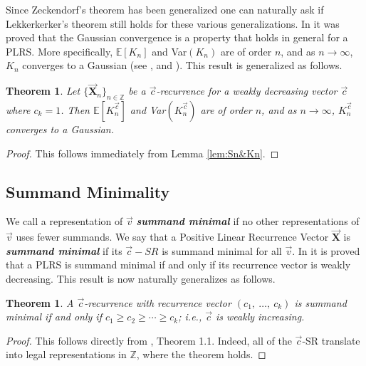 \documentclass[]{interact}
\newcommand{\Z}{{\mathbb Z}}  %
\newcommand{\vtr}[1]{\vec{\mathbf{#1}}}
\theoremstyle{plain}
\numberwithin{equation}{section} %
\newtheorem{theorem}[thm]{Theorem}
\numberwithin{table}{section} %
\numberwithin{figure}{section}
\newcommand{\X}{\vtr{X}}
\begin{document}
Since Zeckendorf's theorem has been generalized one can naturally ask if Lekkerkerker's theorem still holds for these various generalizations. In \textcolor{blue}{\cite{MW12}} it was proved that the Gaussian convergence is a property that holds in general for a PLRS. More specifically, $\mathbb{E}[K_n]$ and Var$(K_n)$ are of order $n$, and as $n \rightarrow \infty$, $K_n$ converges to a Gaussian (see \textcolor{blue}{\cite{KKMW11}}, \textcolor{blue}{\cite{BILMT13}} and \textcolor{blue}{\cite{Lekkerkerker51}}). This result is generalized as follows.

\begin{theorem}
    Let $\{\X_n\}_{n \in \Z}$ be a %
    $\vec{c}$-recurrence for a weakly decreasing vector $\vec{c}$ where $c_k = 1$. Then $\mathbb{E}[K_n^{\vec{c}}]$ and {\rm Var}$(K_n^{\vec{c}})$ are of order $n$, and as $n \rightarrow \infty$, $K_n^{\vec{c}}$ converges to a Gaussian.
\end{theorem}
\begin{proof}
    This follows immediately from Lemma \textcolor{blue}{\ref{lem:Sn&Kn}}.
\end{proof}

\subsection{Summand Minimality}\label{sec: SM}
We call a representation of $\vec{v}$ \textbf{\textit{summand minimal}} if no other representations of $\vec{v}$ uses fewer summands. We say that a Positive Linear Recurrence Vector $\X$ is \textbf{\textit{summand minimal} }if its $\vec{c}-SR$ is summand minimal for all $\vec{v}$. In \textcolor{blue}{\cite{CHHMPV18b}} it is proved that a PLRS is summand minimal if and only if its recurrence vector is weakly decreasing. This result is now naturally generalizes as follows.

\begin{theorem}\label{thm: c minimal}
    A %
    $\vec{c}$-recurrence with recurrence vector $(c_1, \ \ldots, \ c_k)$ is summand minimal if and only if $c_1\geq c_2\geq \cdots \geq c_k$; i.e., $\vec{c}$ is weakly increasing. 
\end{theorem}
\begin{proof}
    This follows directly from \textcolor{blue}{\cite{CHHMPV18b}}, Theorem 1.1.
Indeed, all of the $\vec{c}$-SR translate into legal representations in $\Z$, where the theorem holds.

\end{proof}
\end{document}
